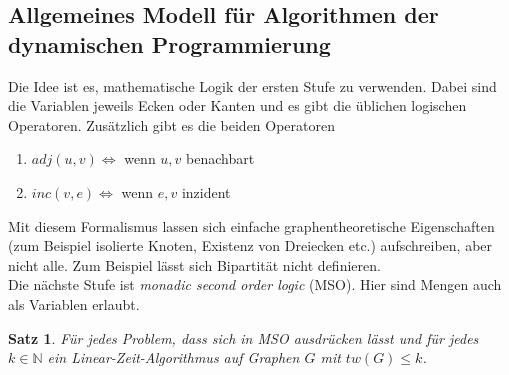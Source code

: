 \documentclass[a4paper, 12pt]{article}
\theoremstyle{plain}
\newtheorem{theorem}{Satz}[subsection] %
\theoremstyle{definition}
\theoremstyle{lemma}
\theoremstyle{remark}
\theoremstyle{corollary}
\theoremstyle{example}
\begin{document}
	\subsection{Allgemeines Modell für Algorithmen der dynamischen Programmierung}
	Die Idee ist es, mathematische Logik der ersten Stufe zu verwenden. Dabei sind die Variablen jeweils Ecken oder Kanten und es gibt die üblichen logischen Operatoren. Zusätzlich gibt es die beiden Operatoren \begin{enumerate}
		\item $adj(u,v) \Leftrightarrow $ wenn $u,v$ benachbart
		\item $inc(v,e) \Leftrightarrow$ wenn $e,v$ inzident
	\end{enumerate}
	Mit diesem Formalismus lassen sich einfache graphentheoretische Eigenschaften (zum Beispiel isolierte Knoten, Existenz von Dreiecken etc.) aufschreiben, aber nicht alle. Zum Beispiel lässt sich Bipartität nicht definieren.\\
	Die nächste Stufe ist \textit{monadic second order logic} (MSO). Hier sind Mengen auch als Variablen erlaubt.
	\begin{theorem}
		Für jedes Problem, dass sich in MSO ausdrücken lässt und für jedes $k \in \mathbb{N}$ ein Linear-Zeit-Algorithmus auf Graphen $G$ mit $tw(G) \leq k$.
	\end{theorem}
\end{document}
